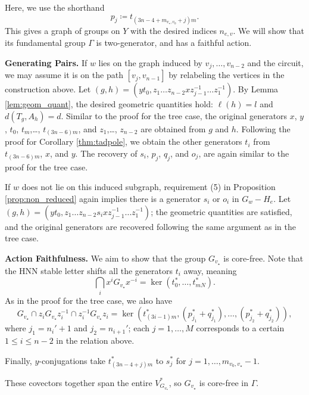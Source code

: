 \documentclass[12pt,leqno]{amsart}
\makeatletter
\renewenvironment{proof}[1][\proofname]{%
	\par
	\pushQED{\qed}%
	\normalfont
	\topsep6\p@\@plus6\p@\relax
	\trivlist
	\item[\hskip\labelsep\itshape #1\@addpunct{.}]%
	\ignorespaces
}{%
	\par\nobreak\vspace{2pt}%
	\popQED%
	\medskip%
	\endtrivlist
	\@endpefalse
}
\newcommand{\2}{L^2_{\rm per}(0, T)}
\numberwithin{equation}{section}
\numberwithin{figure}{section}
\makeatother
\begin{document}
Here, we use the shorthand
\[
p_j\coloneqq t_{(3n-4+m_{v_\star,v_0}+j)m}.
\]
This gives a graph of groups on $Y$ with the desired indices $n_{e,v}$. We will show that its fundamental group $\Gamma$ is two-generator, and has a faithful action.
\begin{proof}[Proof of Theorem \ref{thm:ellip_gog}, $Y$ is unicyclic]
    \textbf{Generating Pairs.} If $w$ lies on the graph induced by $v_j,\dots, v_{n-2}$ and the circuit, we may assume it is on the path $[v_j,v_{n-1}]$ by relabeling the vertices in the construction above. Let $(g,h) = (yt_0,z_1\dots z_{n-2}xz_{j-1}^{-1}\dots z_1^{-1})$. By Lemma \ref{lem:geom_quant}, the desired geometric quantities hold: $\ell(h) = l$ and $d(T_g,A_h) = d$. Similar to the proof for the tree case, the original generators $x$, $y$, $t_0$, $t_{m}$,\dots, $t_{(3n-6)m}$, and $z_1$,\dots, $z_{n-2}$ are obtained from $g$ and $h$. Following the proof for Corollary \ref{thm:tadpole}, we obtain the other generators $t_i$ from $t_{(3n-6)m}$, $x$, and $y$. The recovery of $s_i$, $p_j$, $q_j$, and $o_j$, are again similar to the proof for the tree case.

    If $w$ does not lie on this induced subgraph, requirement (5) in Proposition \ref{prop:non_reduced} again implies there is a generator $s_i$ or $o_i$ in $G_w - H_e$. Let $(g,h) = (yt_0,z_1\dots z_{n-2}s_ixz_{j-1}^{-1}\dots z_1^{-1})$; the geometric quantities are satisfied, and the original generators are recovered following the same argument as in the tree case.

    \textbf{Action Faithfulness.} We aim to show that the group $G_{v_\star}$ is core-free. Note that the HNN stable letter shifts all the generators $t_i$ away, meaning
    \[
    \bigcap_i x^i G_{v_\star} x^{-i} = \ker(t_0^*,\dots, t_{mN}^*).
    \]
    As in the proof for the tree case, we also have
    \[
    G_{v_\star}\cap z_iG_{v_\star} z_i^{-1}\cap z_i^{-1}G_{v_\star} z_i = \ker(t_{(3i-1)m}^*, (p_{j_1}^*+q_{j_1}^*),\dots, (p_{j_2}^*+q_{j_2}^*)),
    \]
    where $j_1 = n_i'+1$ and $j_2 = n_{i+1}'$; each $j=1,\dots, M$ corresponds to a certain $1\leq i\leq n-2$ in the relation above.

    Finally, $y$-conjugations take $t_{(3n-4+j)m}^*$ to $s_j^*$ for $j=1,\dots, m_{v_0,v_\star}-1$.
    
    These covectors together span the entire $V^*_{G_{v_\star}}$, so $G_{v_\star}$ is core-free in $\Gamma$.
\end{proof}
\end{document}
